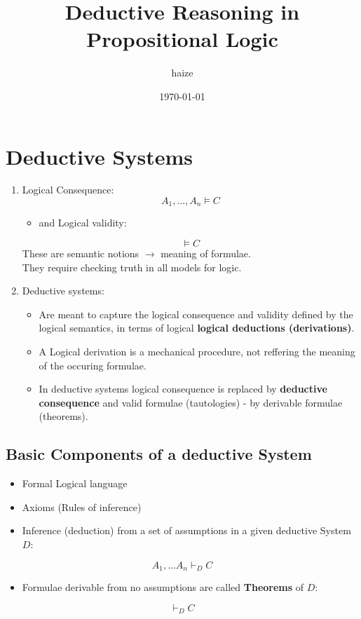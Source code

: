 \documentclass[11pt]{article}
\author{haize}
\date{\today}
\title{Deductive Reasoning in Propositional Logic}
\begin{document}
\maketitle
\tableofcontents

\section{Deductive Systems}
\label{sec:org0b516f7}

\begin{enumerate}
\item Logical Consequence:
\label{sec:org9c5f188}
\[ A_1 , ..., A_n \models C
\]
\begin{itemize}
\item and Logical validity:
\end{itemize}
\[ \models C\]
These are semantic notions \(\rightarrow\) meaning of formulae. \\
They require checking truth in all models for logic.
\item Deductive systems:
\label{sec:orge606e53}
\begin{itemize}
\item Are meant to capture the logical consequence and validity defined by the logical semantics, in terms of logical \textbf{\textbf{logical deductions (derivations)}}.
\item A Logical derivation is a mechanical procedure, not reffering the meaning of the occuring formulae.
\item In deductive systems logical consequence is replaced by \textbf{\textbf{deductive consequence}} and valid formulae (tautologies) - by derivable formulae (theorems).
\end{itemize}
\end{enumerate}
\subsection{Basic Components of a deductive System}
\label{sec:org6134568}
\begin{itemize}
\item Formal Logical language
\item Axioms (Rules of inference)
\item Inference (deduction) from a set of assumptions in a given deductive System \(D\):
\end{itemize}
\[A_1, ... A_n \vdash_D C\]
\begin{itemize}
\item Formulae derivable from no assumptions are called \textbf{\textbf{Theorems}} of \(D\):
\end{itemize}
\[\vdash_D C\]
\end{document}
